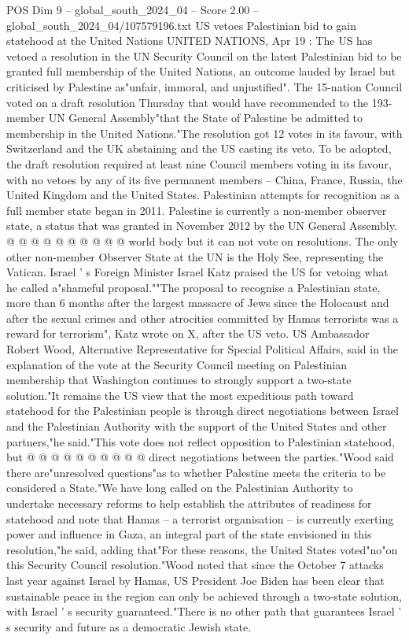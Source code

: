\begin{textsample}{POS Dim 9 – global\_south\_2024\_04 – Score 2.00 – global\_south\_2024\_04/107579196.txt}  \label{ex:f9_pos_115}
US vetoes Palestinian bid to gain statehood at the United Nations UNITED NATIONS, Apr 19 : The US has vetoed a resolution in the UN Security Council on the latest Palestinian bid to be granted full membership of the United Nations, an outcome lauded by Israel but criticised by Palestine as"unfair, immoral, and unjustified".
The 15-nation Council voted on a draft resolution Thursday that would have recommended to the 193-member UN General Assembly"that the State of Palestine be admitted to membership in the United Nations."The resolution got 12 votes in its favour, with Switzerland and the UK abstaining and the US casting its veto.
To be adopted, the draft resolution required at least nine Council members voting in its favour, with no vetoes by any of its five permanent members -- China, France, Russia, the United Kingdom and the United States.
Palestinian attempts for recognition as a full member state began in 2011.
Palestine is currently a non-member observer state, a status that was granted in November 2012 by the UN General Assembly. @ @ @ @ @ @ @ @ @ @ world body but it can not vote on resolutions.
The only other non-member Observer State at the UN is the Holy See, representing the Vatican.
Israel ' s Foreign Minister Israel Katz praised the US for vetoing what he called a"shameful proposal.""The proposal to recognise a Palestinian state, more than 6 months after the largest massacre of Jews since the Holocaust and after the sexual crimes and other atrocities committed by Hamas terrorists was a reward for terrorism", Katz wrote on X, after the US veto.
US Ambassador Robert Wood, Alternative Representative for Special Political Affairs, said in the explanation of the vote at the Security Council meeting on Palestinian membership that Washington continues to strongly support a two-state solution."It remains the US view that the most expeditious path toward statehood for the Palestinian people is through direct negotiations between Israel and the Palestinian Authority with the support of the United States and other partners,"he said."This vote does not reflect opposition to Palestinian statehood, but @ @ @ @ @ @ @ @ @ @ direct negotiations between the parties."Wood said there are"unresolved questions"as to whether Palestine meets the criteria to be considered a State."We have long called on the Palestinian Authority to undertake necessary reforms to help establish the attributes of readiness for statehood and note that Hamas -- a terrorist organisation -- is currently exerting power and influence in Gaza, an integral part of the state envisioned in this resolution,"he said, adding that"For these reasons, the United States voted"no"on this Security Council resolution."Wood noted that since the October 7 attacks last year against Israel by Hamas, US President Joe Biden has been clear that sustainable peace in the region can only be achieved through a two-state solution, with Israel ' s security guaranteed."There is no other path that guarantees Israel ' s security and future as a democratic Jewish state.

\end{textsample}

